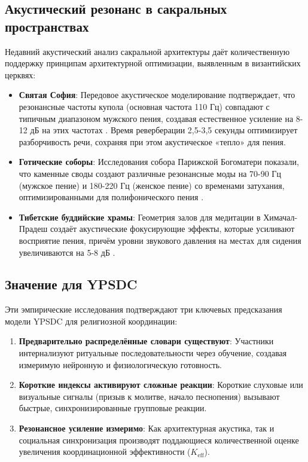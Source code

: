 \documentclass[12pt,a4paper]{article}
\begin{document}
	\subsection{Акустический резонанс в сакральных пространствах}
	
	Недавний акустический анализ сакральной архитектуры даёт количественную поддержку принципам архитектурной оптимизации, выявленным в византийских церквях:
	
	\begin{itemize}
		\item \textbf{Святая София}: Передовое акустическое моделирование подтверждает, что резонансные частоты купола (основная частота 110 Гц) совпадают с типичным диапазоном мужского пения, создавая естественное усиление на 8-12 дБ на этих частотах \cite{Pentcheva2020}. Время реверберации 2,5-3,5 секунды оптимизирует разборчивость речи, сохраняя при этом акустическое «тепло» для пения.
		
		\item \textbf{Готические соборы}: Исследования собора Парижской Богоматери показали, что каменные своды создают различные резонансные моды на 70-90 Гц (мужское пение) и 180-220 Гц (женское пение) со временами затухания, оптимизированными для полифонического пения \cite{Suarez2021}.
		
		\item \textbf{Тибетские буддийские храмы}: Геометрия залов для медитации в Химачал-Прадеш создаёт акустические фокусирующие эффекты, которые усиливают восприятие пения, причём уровни звукового давления на местах для сидения увеличиваются на 5-8 дБ \cite{Dimde2022}.
	\end{itemize}
	
	\subsection{Значение для YPSDC}
	
	Эти эмпирические исследования подтверждают три ключевых предсказания модели YPSDC для религиозной координации:
	
	\begin{enumerate}
		\item \textbf{Предварительно распределённые словари существуют}: Участники интернализуют ритуальные последовательности через обучение, создавая измеримую нейронную и физиологическую готовность.
		\item \textbf{Короткие индексы активируют сложные реакции}: Короткие слуховые или визуальные сигналы (призыв к молитве, начало песнопения) вызывают быстрые, синхронизированные групповые реакции.
		\item \textbf{Резонансное усиление измеримо}: Как архитектурная акустика, так и социальная синхронизация производят поддающиеся количественной оценке увеличения координационной эффективности ($K_{\mathrm{eff}}$).
	\end{enumerate}
	
\end{document}
